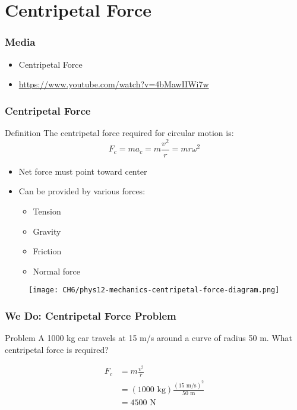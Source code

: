 \documentclass{beamer}
\begin{document}
\section{Centripetal Force}

\begin{frame}
\frametitle{Media}
     \begin{itemize}
  \item Centripetal Force
  \item \hyperlink{https://www.youtube.com/watch?v=4bMawIIWi7w}{https://www.youtube.com/watch?v=4bMawIIWi7w}
  \end{itemize}
\end{frame}
    

\begin{frame}
\frametitle{Centripetal Force}
\begin{block}{Definition}
The centripetal force required for circular motion is:
\[ F_c = ma_c = m\frac{v^2}{r} = mr\omega^2 \]
\end{block}
\begin{itemize}
\item Net force must point toward center
\item Can be provided by various forces:
  \begin{itemize}
  \item Tension
  \item Gravity
  \item Friction
  \item Normal force
  \end{itemize}
\end{itemize}
\end{frame}

\begin{frame}
\begin{figure}
    \centering
    \texttt{[image: CH6/phys12-mechanics-centripetal-force-diagram.png]}
\end{figure}
\end{frame}

\begin{frame}
\frametitle{We Do: Centripetal Force Problem}
\begin{block}{Problem}
A 1000 kg car travels at 15 m/s around a curve of radius 50 m.
What centripetal force is required?
\end{block}
\begin{align*}
F_c &= m\frac{v^2}{r} \\
&= (1000\text{ kg})\frac{(15\text{ m/s})^2}{50\text{ m}} \\
&= 4500\text{ N}
\end{align*}
\end{frame}
\end{document}

